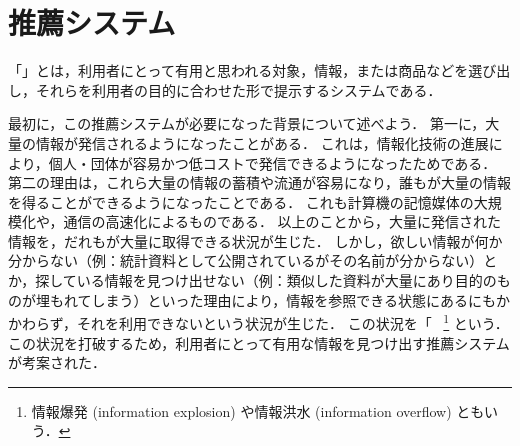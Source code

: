 \chapter{推薦システム}
\label{chap:intro}

「」とは，利用者にとって有用と思われる対象，情報，または商品などを選び出し，それらを利用者の目的に合わせた形で提示するシステムである．

最初に，この推薦システムが必要になった背景について述べよう．
第一に，大量の情報が発信されるようになったことがある．
これは，情報化技術の進展により，個人・団体が容易かつ低コストで発信できるようになったためである．
第二の理由は，これら大量の情報の蓄積や流通が容易になり，誰もが大量の情報を得ることができるようになったことである．
これも計算機の記憶媒体の大規模化や，通信の高速化によるものである．
以上のことから，大量に発信された情報を，だれもが大量に取得できる状況が生じた．
しかし，欲しい情報が何か分からない（例：統計資料として公開されているがその名前が分からない）とか，探している情報を見つけ出せない（例：類似した資料が大量にあり目的のものが埋もれてしまう）といった理由により，情報を参照できる状態にあるにもかかわらず，それを利用できないという状況が生じた．
この状況を「~\cite{misc:009}
\footnote{情報爆発 (information explosion) や情報洪水 (information overflow) ともいう．}
という．
この状況を打破するため，利用者にとって有用な情報を見つけ出す推薦システムが考案された．

